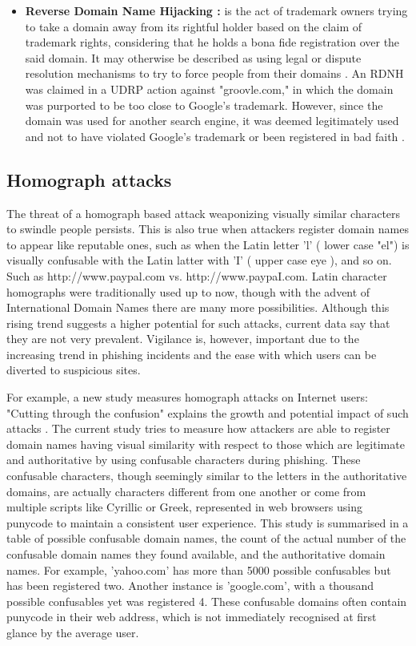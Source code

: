 \begin{itemize}
     \item \textbf{Reverse Domain Name Hijacking  :} is the act of trademark owners trying to take a domain away from its rightful holder based on the claim of trademark rights, considering that he holds a bona fide registration over the said domain. It may otherwise be described as using legal or dispute resolution mechanisms to try to force people from their domains \cite{Sun2006DomainTrademarkConflict}.  An RDNH was claimed in a UDRP action against "groovle.com," in which the domain was purported to be too close to Google's trademark. However, since the domain was used for another search engine, it was deemed legitimately used and not to have violated Google's trademark or been registered in bad faith \cite{Singh2011ReverseDomainHijacking}.
\end{itemize}


\subsection {Homograph attacks} 

The threat of a homograph based attack weaponizing visually similar characters to swindle people persists. This is also true when attackers register domain names to appear like reputable ones, such as when the Latin letter 'l' ( lower case "el") is visually confusable with the Latin latter with 'I' ( upper case eye ), and so on. Such as http://www.paypal.com vs. http://www.paypaI.com.  Latin character homographs were traditionally used up to now, though with the advent of International Domain Names there are many more possibilities. Although this rising trend suggests a higher potential for such attacks, current data say that they are not very prevalent. Vigilance is, however, important due to the increasing trend in phishing incidents and the ease with which users can be diverted to suspicious sites.

For example, a new study measures homograph attacks on Internet users: "Cutting through the confusion" explains the growth and potential impact of such attacks \cite{holgers2006homograph}. The current study tries to measure how attackers are able to register domain names having visual similarity with respect to those which are legitimate and authoritative by using confusable characters during phishing. These confusable characters, though seemingly similar to the letters in the authoritative domains, are actually characters different from one another or come from multiple scripts like Cyrillic or Greek, represented in web browsers using punycode to maintain a consistent user experience. This study is summarised in a table of possible confusable domain names, the count of the actual number of the confusable domain names they found available, and the authoritative domain names. For example, 'yahoo.com' has more than 5000 possible confusables but has been registered two. Another instance is 'google.com', with a thousand possible confusables yet was registered 4. These confusable domains often contain punycode in their web address, which is not immediately recognised at first glance by the average user.

